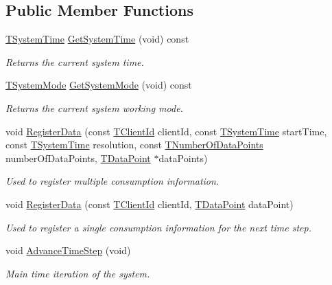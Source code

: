 \subsection*{Public Member Functions}
\begin{DoxyCompactItemize}
\item 
\hyperlink{class_system_manager_a9743ff4f23e7d957f5932780d8070099}{T\-System\-Time} \hyperlink{class_system_manager_aebfc7fab136f01836e07228474e4326f}{Get\-System\-Time} (void) const 
\begin{DoxyCompactList}\small\item\em Returns the current system time. \end{DoxyCompactList}\item 
\hyperlink{class_system_manager_aa32b3f50b8882c8aa7a9ca88ab7a43dd}{T\-System\-Mode} \hyperlink{class_system_manager_ab9f52e613fdbdc4690be79179b7357e6}{Get\-System\-Mode} (void) const 
\begin{DoxyCompactList}\small\item\em Returns the current system working mode. \end{DoxyCompactList}\item 
void \hyperlink{class_system_manager_abaf36dbd2e75a773f2ddc40ac82e5f3b}{Register\-Data} (const \hyperlink{class_system_manager_af957fc0ff78c4c38085c26ac0d81064e}{T\-Client\-Id} client\-Id, const \hyperlink{class_system_manager_a9743ff4f23e7d957f5932780d8070099}{T\-System\-Time} start\-Time, const \hyperlink{class_system_manager_a9743ff4f23e7d957f5932780d8070099}{T\-System\-Time} resolution, const \hyperlink{class_system_manager_a9cb6753ad6cd26b6ad46c194f38bee77}{T\-Number\-Of\-Data\-Points} number\-Of\-Data\-Points, \hyperlink{class_system_manager_a177b09f79bd2cef44160fb4d8ea77996}{T\-Data\-Point} $\ast$data\-Points)
\begin{DoxyCompactList}\small\item\em Used to register multiple consumption information. \end{DoxyCompactList}\item 
void \hyperlink{class_system_manager_ae96634f0635ad6c5e98620eb70ef7fbe}{Register\-Data} (const \hyperlink{class_system_manager_af957fc0ff78c4c38085c26ac0d81064e}{T\-Client\-Id} client\-Id, \hyperlink{class_system_manager_a177b09f79bd2cef44160fb4d8ea77996}{T\-Data\-Point} data\-Point)
\begin{DoxyCompactList}\small\item\em Used to register a single consumption information for the next time step. \end{DoxyCompactList}\item 
void \hyperlink{class_system_manager_a87443d7e75b0f170535d315c27237253}{Advance\-Time\-Step} (void)
\begin{DoxyCompactList}\small\item\em Main time iteration of the system. \end{DoxyCompactList}\end{DoxyCompactItemize}
